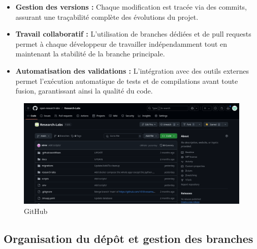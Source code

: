 \documentclass[12pt]{rapportPfe}
\begin{document}
\begin{itemize}
    \item \textbf{Gestion des versions :} Chaque modification est tracée via des commits, assurant une traçabilité complète des évolutions du projet.
    \item \textbf{Travail collaboratif :} L’utilisation de branches dédiées et de pull requests permet à chaque développeur de travailler indépendamment tout en maintenant la stabilité de la branche principale.
    \item \textbf{Automatisation des validations :} L’intégration avec des outils externes permet l’exécution automatique de tests et de compilations avant toute fusion, garantissant ainsi la qualité du code.
\end{itemize}

\FloatBarrier
\begin{figure}[htbp]
    \centering
    \includegraphics[width=1.0\textwidth]{diagrams/ss_02.png}
    \caption{GitHub}
    \label{fig:diagram5}
\end{figure}

\subsection{Organisation du dépôt et gestion des branches}
\end{document}
